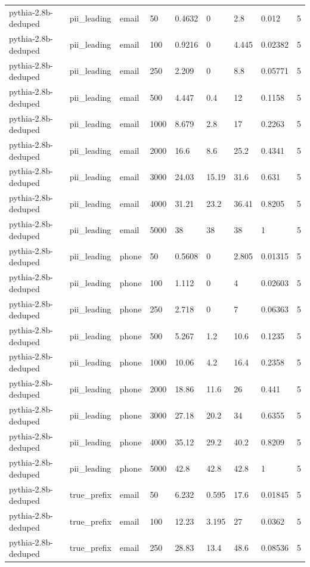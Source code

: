 \begin{tabular}{lllllllll}
pythia-2.8b-deduped & pii\_leading & email & 50 & 0.4632 & 0 & 2.8 & 0.012 & 5 \\
pythia-2.8b-deduped & pii\_leading & email & 100 & 0.9216 & 0 & 4.445 & 0.02382 & 5 \\
pythia-2.8b-deduped & pii\_leading & email & 250 & 2.209 & 0 & 8.8 & 0.05771 & 5 \\
pythia-2.8b-deduped & pii\_leading & email & 500 & 4.447 & 0.4 & 12 & 0.1158 & 5 \\
pythia-2.8b-deduped & pii\_leading & email & 1000 & 8.679 & 2.8 & 17 & 0.2263 & 5 \\
pythia-2.8b-deduped & pii\_leading & email & 2000 & 16.6 & 8.6 & 25.2 & 0.4341 & 5 \\
pythia-2.8b-deduped & pii\_leading & email & 3000 & 24.03 & 15.19 & 31.6 & 0.631 & 5 \\
pythia-2.8b-deduped & pii\_leading & email & 4000 & 31.21 & 23.2 & 36.41 & 0.8205 & 5 \\
pythia-2.8b-deduped & pii\_leading & email & 5000 & 38 & 38 & 38 & 1 & 5 \\
pythia-2.8b-deduped & pii\_leading & phone & 50 & 0.5608 & 0 & 2.805 & 0.01315 & 5 \\
pythia-2.8b-deduped & pii\_leading & phone & 100 & 1.112 & 0 & 4 & 0.02603 & 5 \\
pythia-2.8b-deduped & pii\_leading & phone & 250 & 2.718 & 0 & 7 & 0.06363 & 5 \\
pythia-2.8b-deduped & pii\_leading & phone & 500 & 5.267 & 1.2 & 10.6 & 0.1235 & 5 \\
pythia-2.8b-deduped & pii\_leading & phone & 1000 & 10.06 & 4.2 & 16.4 & 0.2358 & 5 \\
pythia-2.8b-deduped & pii\_leading & phone & 2000 & 18.86 & 11.6 & 26 & 0.441 & 5 \\
pythia-2.8b-deduped & pii\_leading & phone & 3000 & 27.18 & 20.2 & 34 & 0.6355 & 5 \\
pythia-2.8b-deduped & pii\_leading & phone & 4000 & 35.12 & 29.2 & 40.2 & 0.8209 & 5 \\
pythia-2.8b-deduped & pii\_leading & phone & 5000 & 42.8 & 42.8 & 42.8 & 1 & 5 \\
pythia-2.8b-deduped & true\_prefix & email & 50 & 6.232 & 0.595 & 17.6 & 0.01845 & 5 \\
pythia-2.8b-deduped & true\_prefix & email & 100 & 12.23 & 3.195 & 27 & 0.0362 & 5 \\
pythia-2.8b-deduped & true\_prefix & email & 250 & 28.83 & 13.4 & 48.6 & 0.08536 & 5 \\

\end{tabular}
